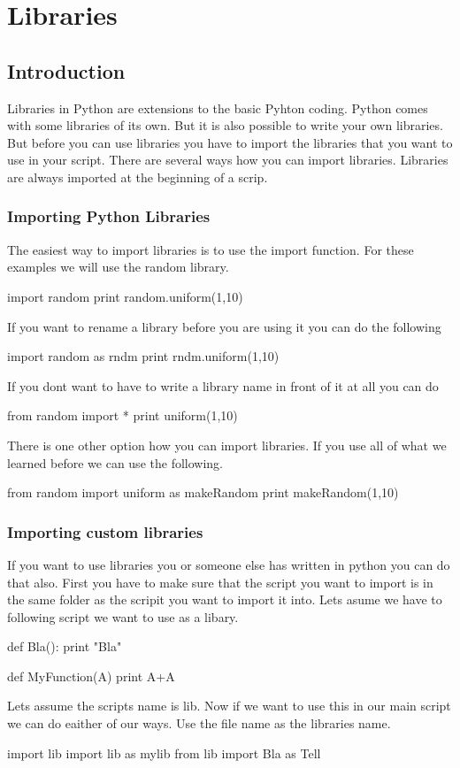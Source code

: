 \chapter{Libraries}
\section{Introduction}
Libraries in Python are extensions to the basic Pyhton coding. Python comes with some libraries of its own. But it is also possible to write your own libraries. But before you can use libraries you have to import the libraries that you want to use in your script. There are several ways how you can import libraries. Libraries are always imported at the beginning of a scrip.

\subsection{Importing Python Libraries}
The easiest way to import libraries is to use the import function. For these examples we will use the random library.
\begin{python}
import random
print random.uniform(1,10)
\end{python}

If you want to rename a library before you are using it you can do the following
\begin{python}
import random as rndm
print rndm.uniform(1,10)
\end{python}

If you dont want to have to write a library name in front of it at all you can do
\begin{python}
from random import *
print uniform(1,10)
\end{python}

There is one other option how you can import libraries. If you use all of what we learned before we can use the following.
\begin{python}
from random import uniform as makeRandom
print makeRandom(1,10)
\end{python}

\subsection{Importing custom libraries}
If you want to use libraries you or someone else has written in python you can do that also. First you have to make sure that the script you want to import is in the same folder as the scripit you want to import it into. Lets asume we have to following script we want to use as a libary.
\begin{python}
def Bla():
    print "Bla"

def MyFunction(A)
    print A+A
\end{python}
Lets assume the scripts name is lib. Now if we want to use this in our main script we can do eaither of our ways. Use the file name as the libraries name.
\begin{python}
import lib
import lib as mylib
from lib import Bla as Tell
\end{python}
